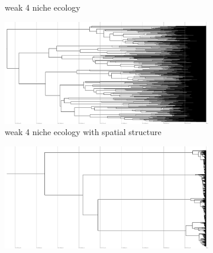 \begin{figure}
\begin{subfigure}[b]{0.5\columnwidth}
    \caption{%
      weak 4 niche ecology}
  \end{subfigure}
  \hfill
  \begin{subfigure}[b]{0.5\columnwidth}
      \includegraphics[height=0.12\textheight,width=\textwidth]{img/perfect-tree-phylogenies-log/epoch=7+resolution=3+treatment=24.pdf}    %
    \caption{%
      weak 4 niche ecology with spatial structure }
  \end{subfigure}
  \hfill
  \begin{subfigure}[b]{0.5\columnwidth}
    \includegraphics[height=0.12\textheight,width=\textwidth]{img/perfect-tree-phylogenies-log/epoch=7+resolution=3+treatment=10.pdf}

\end{subfigure}
\end{figure}

